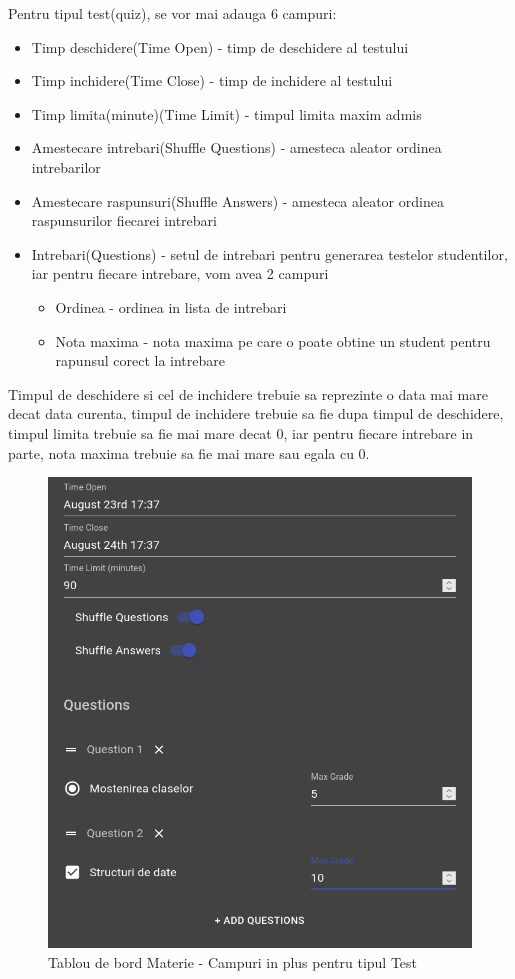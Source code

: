 \documentclass[12pt, a4paper, oneside, romanian]{teza-upb}
\begin{document}
Pentru tipul test(quiz), se vor mai adauga 6 campuri:
\begin{itemize}
	\item Timp deschidere(Time Open) - timp de deschidere al testului
	\item Timp inchidere(Time Close) - timp de inchidere al testului
	\item Timp limita(minute)(Time Limit) - timpul limita maxim admis
	\item Amestecare intrebari(Shuffle Questions) - amesteca aleator ordinea intrebarilor
	\item Amestecare raspunsuri(Shuffle Answers) - amesteca aleator ordinea raspunsurilor fiecarei intrebari
	\item Intrebari(Questions) - setul de intrebari pentru generarea testelor studentilor, iar pentru fiecare intrebare, vom avea 2 campuri
		\begin{itemize}
			\item Ordinea - ordinea in lista de intrebari
			\item Nota maxima - nota maxima pe care o poate obtine un student pentru rapunsul corect la intrebare
		\end{itemize}
\end{itemize}
Timpul de deschidere si cel de inchidere trebuie sa reprezinte o data mai mare decat data curenta, timpul de inchidere trebuie sa fie dupa timpul de deschidere, timpul limita trebuie sa fie mai mare decat 0, iar pentru fiecare intrebare in parte, nota maxima trebuie sa fie mai mare sau egala cu 0.

\begin{figure}[H]
\centering
\includegraphics*[width=0.7\columnwidth]{tablou-de-bord-materie-campuri-test}
\caption{Tablou de bord Materie - Campuri in plus pentru tipul Test}
\label{tablou-de-bord-materie-campuri-test}
\end{figure}
\end{document}
